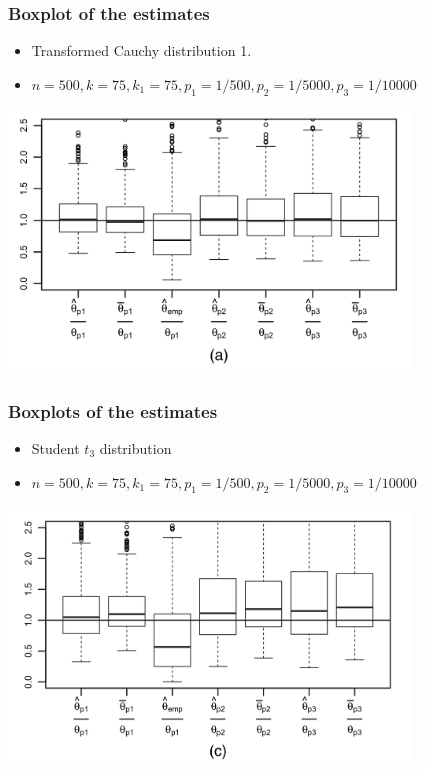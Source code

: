 \documentclass{beamer}
\begin{document}
\begin{frame}
    \frametitle{Boxplot of the estimates}
    \begin{itemize}
        \item Transformed Cauchy distribution 1.
        \item $n=500, k=75, k_1 = 75, p_1=1/500, p_2=1/5000,p_3=1/10000$
    \end{itemize}

\includegraphics[width=0.8\textwidth]{a.png}
    

\end{frame}

\begin{frame}
    \frametitle{Boxplots of the estimates}
\begin{itemize}
    \item Student $t_3$ distribution
    \item $n=500, k=75, k_1 = 75, p_1=1/500, p_2=1/5000,p_3=1/10000$
\end{itemize}
\includegraphics[width=0.8\textwidth]{c.png}

    

\end{frame}
\end{document}
